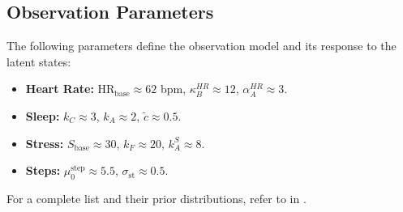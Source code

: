 \subsection{Observation Parameters}

The following parameters define the observation model and its response to the latent states:
\begin{itemize}
    \item \textbf{Heart Rate:} $\text{HR}_{\text{base}} \approx 62$ bpm, $\kappa_B^{HR} \approx 12$, $\alpha_A^{HR} \approx 3$.
    \item \textbf{Sleep:} $k_C \approx 3$, $k_A \approx 2$, $\tilde{c} \approx 0.5$.
    \item \textbf{Stress:} $S_{\text{base}} \approx 30$, $k_F \approx 20$, $k_A^S \approx 8$.
    \item \textbf{Steps:} $\mu_0^{\text{step}} \approx 5.5$, $\sigma_{\text{st}} \approx 0.5$.
\end{itemize}
For a complete list and their prior distributions, refer to  in .
